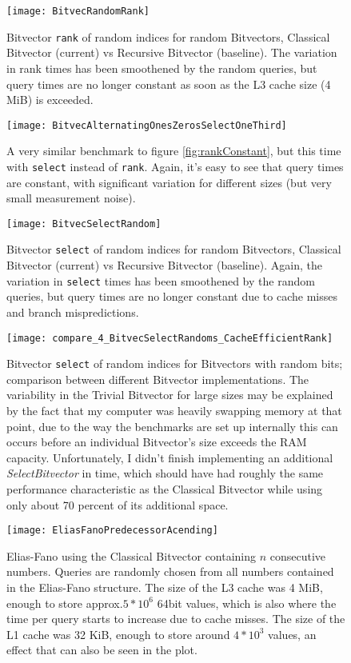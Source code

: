 \documentclass[a4paper,UKenglish,cleveref, autoref, thm-restate]{lipics-v2021}
\newcommand{\stress}[1] {\textit{#1}}
\newcommand{\rank} {\texttt{rank}}
\newcommand{\select} {\texttt{select}}
\begin{document}
\begin{figure}[h]
\caption{Bitvector \rank{} of random indices for random Bitvectors, Classical Bitvector (current) vs Recursive Bitvector (baseline).
The variation in rank times has been smoothened by the random queries, but query times are no longer constant as soon as the L3 cache size (4 MiB)
is exceeded.}
\centering
\texttt{[image: BitvecRandomRank]}
\end{figure}

\begin{figure}[h]
\caption{A very similar benchmark to figure \ref{fig:rankConstant}, but this time with \select{} instead of \rank{}.
Again, it's easy to see that query times are constant, with significant variation for different sizes (but very small measurement noise).}
\centering
\texttt{[image: BitvecAlternatingOnesZerosSelectOneThird]}
\end{figure}

\begin{figure}[h]
\caption{Bitvector \select{} of random indices for random Bitvectors, Classical Bitvector (current) vs Recursive Bitvector (baseline).
Again, the variation in \select{} times has been smoothened by the random queries, but query times are no longer constant due to cache misses
and branch mispredictions.}
\centering
\texttt{[image: BitvecSelectRandom]}
\end{figure}


\begin{figure}[h]
\caption{Bitvector \select{} of random indices for Bitvectors with random bits; comparison between different Bitvector implementations.
The variability in the Trivial Bitvector for large sizes may be explained by the fact that my computer was heavily swapping memory at that point,
due to the way the benchmarks are set up internally this can occurs before an individual Bitvector's size exceeds the RAM capacity.
Unfortunately, I didn't finish implementing an additional \stress{SelectBitvector} in time, which should have had roughly the same performance characteristic as the Classical Bitvector while using only about 70 percent of its additional space.}
\centering
\texttt{[image: compare\_4\_BitvecSelectRandoms\_CacheEfficientRank]}
\end{figure}


\begin{figure}[h]
\caption{Elias-Fano using the Classical Bitvector containing $n$ consecutive numbers. Queries are randomly chosen from all numbers
contained in the Elias-Fano structure. The size of the L3 cache was 4 MiB, enough to store approx.\@$5 * 10^6$ 64bit values, which is also
where the time per query starts to increase due to cache misses. The size of the L1 cache was 32 KiB, enough to store around $4 * 10^3$ values,
an effect that can also be seen in the plot.}
\centering
\texttt{[image: EliasFanoPredecessorAcending]}
\end{figure}
\end{document}
